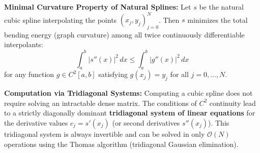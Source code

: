 \begin{theorem}
    \textbf{Minimal Curvature Property of Natural Splines:} Let $s$ be the natural cubic spline interpolating the points $(x_j, y_j)_{j=0}^N$. Then $s$ minimizes the total bending energy (graph curvature) among all twice continuously differentiable interpolants:
    $$\int_a^b |s''(x)|^2 \, dx \le \int_a^b |g''(x)|^2 \, dx$$
    for any function $g \in C^2[a,b]$ satisfying $g(x_j) = y_j$ for all $j = 0, \dots, N$.
\end{theorem}

\begin{remark}
    \textbf{Computation via Tridiagonal Systems:} Computing a cubic spline does not require solving an intractable dense matrix. The conditions of $C^2$ continuity lead to a strictly diagonally dominant \textbf{tridiagonal system of linear equations} for the derivative values $c_j = s'(x_j)$ (or second derivatives $s''(x_j)$). This tridiagonal system is always invertible and can be solved in only $\mathcal{O}(N)$ operations using the Thomas algorithm (tridiagonal Gaussian elimination).
\end{remark}